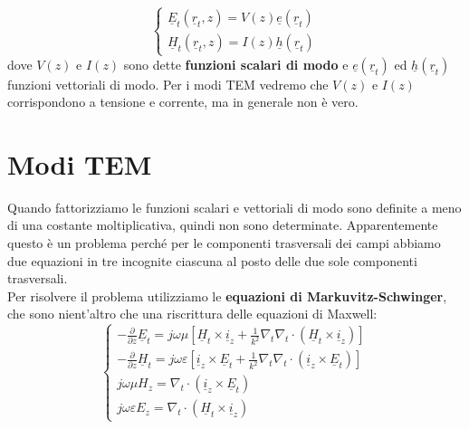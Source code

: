 \documentclass{book}
\begin{document}
        \begin{equation}
            \label{eqn:fattorizzazione_modi}
            \begin{cases}
                \underline{E}_{t}(\underline{r}_{t},z)=V(z)\underline{e}(\underline{r}_{t}) \\
                \underline{H}_{t}(\underline{r}_{t},z)=I(z)\underline{h}(\underline{r}_{t})
            \end{cases}
        \end{equation}
        dove $V(z)$ e $I(z)$ sono dette \textbf{funzioni scalari di modo} e $\underline{e}(\underline{r}_{t})$ ed $\underline{h}(\underline{r}_{t})$ funzioni 
        vettoriali di modo. Per i modi TEM vedremo che $V(z)$ e $I(z)$ corrispondono a tensione e corrente, ma in generale non è vero.
    \section{Modi TEM}
    Quando fattorizziamo le funzioni scalari e vettoriali di modo sono definite a meno di una costante moltiplicativa, quindi non sono determinate.
    Apparentemente questo è un problema perché per le componenti trasversali dei campi abbiamo due equazioni in tre incognite ciascuna al posto delle due sole
    componenti trasversali.\\
    Per risolvere il problema utilizziamo le \textbf{equazioni di Markuvitz-Schwinger}, che sono nient'altro 
    che una riscrittura delle equazioni di Maxwell:
    \begin{equation}
        \label{eqn:eq_Markuvitz-Schwinger}
        \begin{cases}
            \displaystyle -\frac{\partial}{\partial z}\underline{E}_{t}=j \omega \mu [\underline{H}_{t}\times \underline{i}_{z}+\displaystyle \frac{1}{k^{2}}\nabla_{t}\nabla_{t}\cdot (\underline{H}_{t} \times \underline{i}_{z})] \\
            \displaystyle - \frac{\partial}{\partial z}\underline{H}_{t}=j\omega \varepsilon [\underline{i}_{z} \times \underline{E}_{t}+ \displaystyle \frac{1}{k^{2}}\nabla_{t} \nabla_{t} \cdot (\underline{i}_{z} \times \underline{E}_{t})] \\
            j \omega \mu H_{z} = \nabla_{t} \cdot (\underline{i}_{z} \times \underline{E}_{t}) \\
            j \omega \varepsilon E_{z}=\nabla_{t}\cdot (\underline{H}_{t} \times \underline{i}_{z})
        \end{cases}
    \end{equation}
\end{document}
